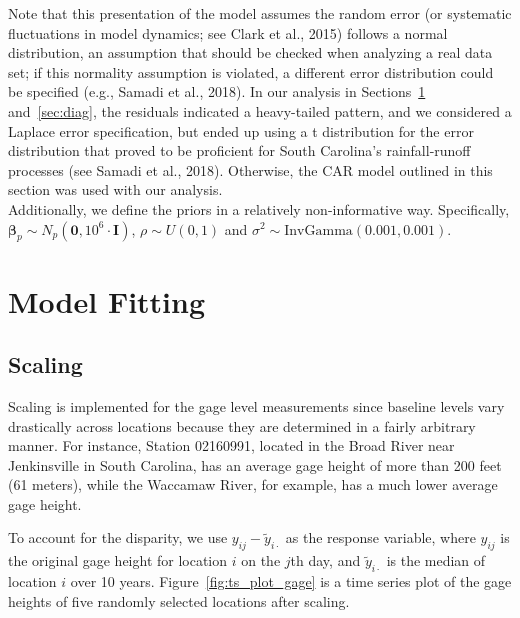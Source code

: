 \documentclass{svjour3}
\renewcommand\hl[1]{#1}
\begin{document}
Note that this presentation of the model assumes the random error (or systematic fluctuations in model dynamics;
see Clark et al., 2015)  follows a normal distribution, an assumption that should be checked when analyzing a real data set;
if this normality assumption is violated, a different error distribution could be specified (e.g., Samadi et al., 2018).
  In our analysis in Sections~\ref{sec:model_fitting} and~\ref{sec:diag}, the residuals indicated a heavy-tailed pattern, and we considered a Laplace error specification, but ended up using a t distribution for the error distribution that proved to be proficient for South Carolina's rainfall-runoff processes (see Samadi et al., 2018).
   Otherwise, the CAR model outlined in this section was used with our analysis.\\

Additionally, we define the priors in a relatively non-informative way.
Specifically, $ \boldsymbol{\beta}_p \sim N_p(\mathbf 0, 10^6\cdot \mathbf I)$, $ \rho \sim U(0, 1)$ and $ \sigma^2 \sim \text{InvGamma}(0.001, 0.001)$.

\section{Model Fitting}\label{sec:model_fitting}
\subsection{Scaling}\label{subsec:scaling}
Scaling is implemented for the gage level measurements since baseline levels vary drastically across locations because they are determined in a fairly arbitrary manner.
For instance, Station 02160991,  located in the Broad River near Jenkinsville in South Carolina, has an average gage height of more than 200 feet \hl{(61 meters)}, while the Waccamaw River, for example, has a much lower average gage height.

To account for the disparity, we use $ y_{ij} -\tilde{y}_{i\cdot}$ as the response variable, where $ y_{ij}$ is the original gage height  for location $i$ on the $ j$th day, and $\tilde{y}_{i\cdot}$ is the median of location $i$ over 10 years.
Figure~\ref{fig:ts_plot_gage} is a time series plot of the gage heights of five randomly selected locations after scaling.
\end{document}
